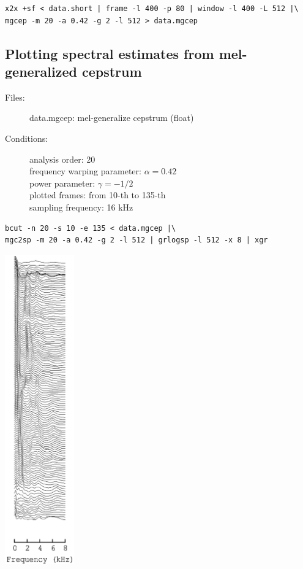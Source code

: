 \documentclass[a4paper,10pt]{article}
\begin{document}
\begin{verbatim}
x2x +sf < data.short | frame -l 400 -p 80 | window -l 400 -L 512 |\
mgcep -m 20 -a 0.42 -g 2 -l 512 > data.mgcep
\end{verbatim}

\subsection{Plotting spectral estimates from mel-generalized cepstrum}

\begin{description}
\item[Files:]
  data.mgcep: mel-generalize cepstrum (float)
\item[Conditions:]
  analysis order: 20\\
  frequency warping parameter: $\alpha = 0.42$\\
  power parameter: $\gamma = -1/2$\\
  plotted frames: from 10-th to 135-th\\
  sampling frequency: 16 kHz
\end{description}

\begin{verbatim}
bcut -n 20 -s 10 -e 135 < data.mgcep |\
mgc2sp -m 20 -a 0.42 -g 2 -l 512 | grlogsp -l 512 -x 8 | xgr
\end{verbatim}

\includegraphics[width=3cm]{data.mgcep.grlogsp.eps}
\end{document}
